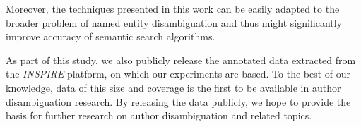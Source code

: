 \documentclass[runningheads,a4paper]{llncs}
\begin{document}
Moreover, the techniques presented in this work can be easily adapted to the broader
problem of named entity disambiguation and thus might significantly improve accuracy of
semantic search algorithms.

As part of this study, we also publicly release the annotated data extracted
from the \emph{INSPIRE} platform, on which our experiments are based.
To the best of our knowledge, data of this size and coverage is the first to be
available in author disambiguation research. By releasing the data publicly,
we hope to provide the basis for further research on author disambiguation
and related topics.




\end{document}
